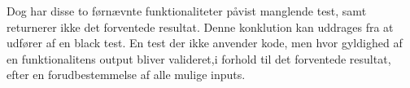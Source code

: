 \documentclass[11pt]{article}
\begin{document}
    \noindent
    Dog har disse to førnævnte funktionaliteter påvist manglende test, samt returnerer ikke det forventede resultat.
    Denne konklution kan uddrages fra at udfører af en black test. En test der ikke anvender kode, men hvor gyldighed af en funktionalitens output bliver valideret,i forhold til det forventede resultat, efter en forudbestemmelse af alle mulige inputs.
    
\end{document}
